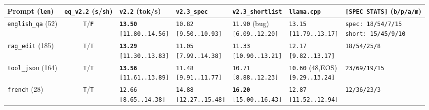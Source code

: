\documentclass[11pt,a4paper]{article}
\begin{document}
\begin{table}[h]
\centering
\footnotesize
\setlength{\tabcolsep}{3.2pt}
\begin{tabular}{@{}lclllll@{}}
\toprule
Prompt (\texttt{len}) & \texttt{eq\_v2.2} (\texttt{s}/\texttt{sh}) & \texttt{v2.2} (tok/s) & \texttt{v2.3\_spec} & \texttt{v2.3\_shortlist} & \texttt{llama.cpp} & \texttt{[SPEC STATS]} (\texttt{b/p/a/m}) \\
\midrule
\texttt{english\_qa} (52) & \texttt{T}/\textbf{\texttt{F}} & \shortstack[l]{\textbf{\texttt{13.50}}\\\scriptsize\texttt{[11.80..14.56]}} & \shortstack[l]{\texttt{10.82}\\\scriptsize\texttt{[9.50..10.93]}} & \shortstack[l]{\texttt{11.90} (bug)\\\scriptsize\texttt{[6.09..12.20]}} & \shortstack[l]{\texttt{13.15}\\\scriptsize\texttt{[11.79..13.17]}} & \shortstack[l]{\texttt{spec: 18/54/7/15}\\\scriptsize\texttt{short: 15/45/9/10}} \\
\texttt{rag\_edit} (185) & \texttt{T}/\texttt{T} & \shortstack[l]{\textbf{\texttt{13.29}}\\\scriptsize\texttt{[11.30..13.83]}} & \shortstack[l]{\texttt{11.05}\\\scriptsize\texttt{[7.99..14.38]}} & \shortstack[l]{\texttt{11.33}\\\scriptsize\texttt{[10.90..13.21]}} & \shortstack[l]{\texttt{12.17}\\\scriptsize\texttt{[9.82..13.17]}} & \texttt{18/54/25/8} \\
\texttt{tool\_json} (164) & \texttt{T}/\texttt{T} & \shortstack[l]{\textbf{\texttt{13.56}}\\\scriptsize\texttt{[11.61..13.89]}} & \shortstack[l]{\texttt{11.48}\\\scriptsize\texttt{[9.91..11.77]}} & \shortstack[l]{\texttt{10.71}\\\scriptsize\texttt{[8.88..12.23]}} & \shortstack[l]{\texttt{10.60} (48,EOS)\\\scriptsize\texttt{[9.29..13.24]}} & \texttt{23/69/19/15} \\
\texttt{french} (28) & \texttt{T}/\texttt{T} & \shortstack[l]{\texttt{12.66}\\\scriptsize\texttt{[8.65..14.38]}} & \shortstack[l]{\texttt{14.88}\\\scriptsize\texttt{[12.27..15.48]}} & \shortstack[l]{\textbf{\texttt{16.20}}\\\scriptsize\texttt{[15.00..16.43]}} & \shortstack[l]{\texttt{12.87}\\\scriptsize\texttt{[11.52..12.94]}} & \texttt{12/36/23/3} \\

\end{tabular}
\end{table}
\end{document}
